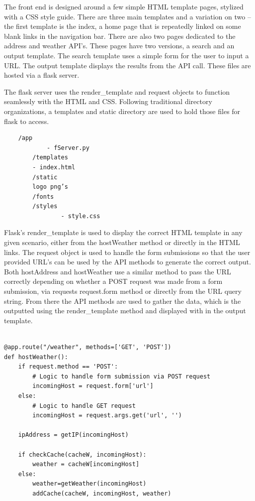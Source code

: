 	The front end is designed around a few simple HTML template pages, stylized with a CSS style guide. There are three main templates and a variation on two – the first template is the index, a home page that is repeatedly linked on some blank links in the navigation bar. There are also two pages dedicated to the address and weather API’s. These pages have two versions, a search and an output template. The search template uses a simple form for the user to input a URL. The output template displays the results from the API call. These files are hosted via a flask server. \cite{grinberg2018flask}

	The flask server uses the render\_template and request objects to function seamlessly with the HTML and CSS. Following traditional directory organizations, a templates and static directory are used to hold those files for flask to access.
	\begin{verbatim}
	/app
    		- fServer.py
    	/templates
        - index.html
    	/static
		logo png’s
		/fonts
      	/styles
            	- style.css
	\end{verbatim}
Flask’s render\_template is used to display the correct HTML template in any given scenario, either from the hostWeather method or directly in the HTML links. The request object is used to handle the form submissions so that the user provided URL’s can be used by the API methods to generate the correct output. Both hostAddress and hostWeather use a similar method to pass the URL correctly depending on whether a POST request was made from a form submission, via requests request.form method or directly from the URL query string. From there the API methods are used to gather the data, which is the outputted using the render\_template method and displayed with in the output template.

\begin{lstlisting}[style=mystyle, caption=hostWeather method handles GET/POST requests, label=lst:python]

@app.route("/weather", methods=['GET', 'POST'])
def hostWeather():
    if request.method == 'POST':
        # Logic to handle form submission via POST request
        incomingHost = request.form['url']
    else:
        # Logic to handle GET request
        incomingHost = request.args.get('url', '')

    ipAddress = getIP(incomingHost)

    if checkCache(cacheW, incomingHost):
        weather = cacheW[incomingHost]
    else:
    	weather=getWeather(incomingHost)
    	addCache(cacheW, incomingHost, weather)

\end{lstlisting}

